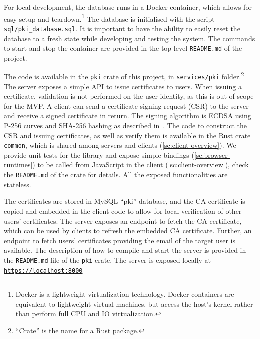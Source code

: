 For local development, 
the database runs in a Docker container, which allows
for easy setup and teardown.\footnote{Docker is a lightweight virtualization technology. Docker containers are equivalent to lightweight virtual machines, but access the host's kernel rather than perform full CPU and IO virtualization.} 
The database is initialised with the script \texttt{sql/pki\_database.sql}.
It is important to have the ability
to easily reset the database to a fresh state 
while developing and testing the system.
The commands to start and stop the container are provided
in the top level \texttt{README.md} of the project.

The code is available in the \texttt{pki} crate
of this project, in \texttt{services/pki} folder.\footnote{``Crate'' is the name for a Rust package.}
The server exposes a simple API
to issue certificates to users. 
When issuing a certificate, validation is not performed
on the user identity, as this is out of scope for the MVP.
A client can send a certificate signing request (CSR)
to the server and receive a signed certificate in return.
The signing algorithm is ECDSA using P-256 curves and SHA-256 hashing
as described in~\cite{rfc5758}.
The code to construct the CSR and issuing certificates, as well as 
verify them is available in the Rust crate \texttt{common},
which is shared among servers and clients (\cref{sc:client-overview}).
We provide unit tests for the library and expose simple bindings (\cref{sc:browser-runtimes}) to be
called from JavaScript in the client (\cref{sc:client-overview}), check the \texttt{README.md}
of the crate for details. All the exposed functionalities are stateless.

The certificates are stored in MySQL ``pki'' database, and the CA
certificate is copied and embedded in the client code to allow
for local verification of other users' certificates.
The server exposes an endpoint to fetch the
CA certificate, which can be used by clients to
refresh the embedded CA certificate.
Further, an endpoint to fetch users' certificates providing the
email of the target user is available.
The description of how to compile and start the server is
provided in the \texttt{README.md} file of the \texttt{pki} crate.
The server is exposed locally at \texttt{\url{https://localhost:8000}}



